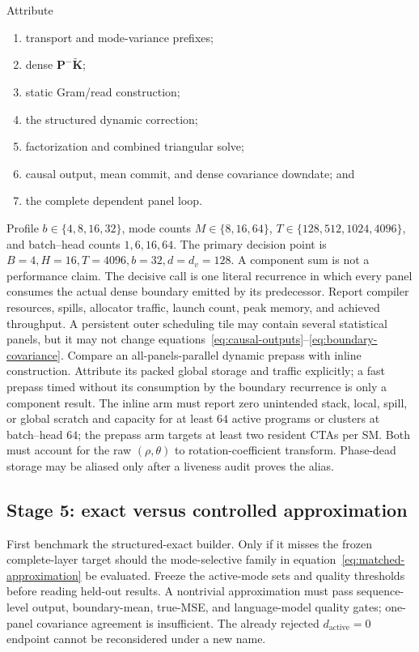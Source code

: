\documentclass[11pt]{article}
\newcommand{\ve}[1]{\boldsymbol{#1}}
\begin{document}
Attribute
\begin{enumerate}[leftmargin=1.8em,itemsep=2pt]
  \item transport and mode-variance prefixes;
  \item dense $\ve{P}^-\widetilde{\ve{K}}$;
  \item static Gram/read construction;
  \item the structured dynamic correction;
  \item factorization and combined triangular solve;
  \item causal output, mean commit, and dense covariance downdate; and
  \item the complete dependent panel loop.
\end{enumerate}
Profile $b\in\{4,8,16,32\}$, mode counts $M\in\{8,16,64\}$,
$T\in\{128,512,1024,4096\}$, and batch--head counts $1,6,16,64$.  The primary decision point is
$B=4,H=16,T=4096,b=32,d=d_v=128$.  A component sum is not a performance claim.  The decisive call is
one literal recurrence in which every panel consumes the actual dense boundary emitted by its
predecessor.  Report compiler resources, spills, allocator traffic, launch count, peak memory,
and achieved throughput.  A persistent outer scheduling tile may contain several statistical
panels, but it may not change equations~\eqref{eq:causal-outputs}--\eqref{eq:boundary-covariance}.
Compare an all-panels-parallel dynamic prepass with inline construction.  Attribute its packed
global storage and traffic explicitly; a fast prepass timed without its consumption by the
boundary recurrence is only a component result.
The inline arm must report zero unintended stack, local, spill, or global scratch and capacity for
at least $64$ active programs or clusters at batch--head $64$; the prepass arm targets at least two
resident CTAs per SM.  Both must account for the raw $(\rho,\theta)$ to rotation-coefficient
transform.  Phase-dead storage may be aliased only after a liveness audit proves the alias.

\subsection{Stage 5: exact versus controlled approximation}

First benchmark the structured-exact builder.  Only if it misses the frozen complete-layer target
should the mode-selective family in equation~\eqref{eq:matched-approximation} be evaluated.  Freeze
the active-mode sets and quality thresholds before reading held-out results.  A nontrivial
approximation must pass sequence-level output, boundary-mean, true-MSE, and language-model quality
gates; one-panel covariance agreement is insufficient.  The already rejected
$d_{\mathrm{active}}=0$ endpoint cannot be reconsidered under a new name.
\end{document}
